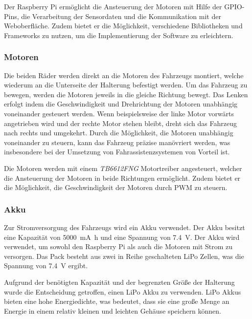         Der Raspberry Pi ermöglicht die Ansteuerung der Motoren mit Hilfe der \ac{GPIO}-Pins, die Verarbeitung der Sensordaten und die Kommunikation mit der Weboberfläche. Zudem bietet er die Möglichkeit, verschiedene Bibliotheken und Frameworks zu nutzen, um die Implementierung der Software zu erleichtern.

        \subsubsection{Motoren}
        Die beiden Räder werden direkt an die Motoren des Fahrzeugs montiert, welche wiederum an die Unterseite der Halterung befestigt werden. Um das Fahrzeug zu bewegen, werden die Motoren jeweils in die gleiche Richtung bewegt. Das Lenken erfolgt indem die Geschwindigkeit und Drehrichtung der Motoren unabhängig voneinander gesteuert werden. Wenn beispielsweise der linke Motor vorwärts angetrieben wird und der rechte Motor stehen bleibt, dreht sich das Fahrzeug nach rechts und umgekehrt. Durch die Möglichkeit, die Motoren unabhängig voneinander zu steuern, kann das Fahrzeug präzise manövriert werden, was insbesondere bei der Umsetzung von Fahrassistenzsystemen von Vorteil ist.

        Die Motoren werden mit einem \textit{TB6612FNG} Motortreiber angesteuert, welcher die Ansteuerung der Motoren in beide Richtungen ermöglicht. Zudem bietet er die Möglichkeit, die Geschwindigkeit der Motoren durch \ac{PWM} zu steuern.


        \subsubsection{Akku}
        Zur Stromversorgung des Fahrzeugs wird ein Akku verwendet. Der Akku besitzt eine Kapazität von \SI{5000}{\milli\ampere\hour} und eine Spannung von \SI{7,4}{\volt}. Der Akku wird verwendet, um sowohl den Raspberry Pi als auch die Motoren mit Strom zu versorgen. Das Pack besteht aus zwei in Reihe geschalteten \ac{LiPo} Zellen, was die Spannung von \SI{7,4}{\volt} ergibt.
        
        Aufgrund der benötigten Kapazität und der begrenzten Größe der Halterung wurde die Entscheidung getroffen, einen \ac{LiPo} Akku zu verwenden. \ac{LiPo} Akkus bieten eine hohe Energiedichte, was bedeutet, dass sie eine große Menge an Energie in einem relativ kleinen und leichten Gehäuse speichern können.

